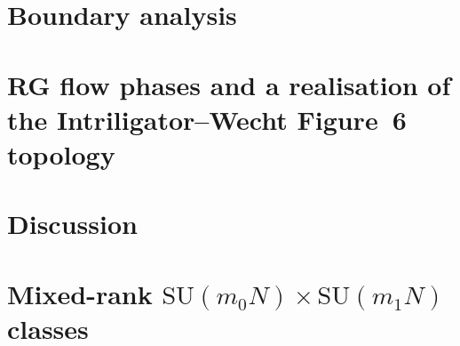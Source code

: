 \documentclass[11pt,a4paper]{article}
\newcommand{\SU}{\mathrm{SU}}
\begin{document}


\section{Boundary analysis}
\label{sec:boundary}



\section{RG flow phases and a realisation of the Intriligator--Wecht
  Figure~6 topology}
\label{sec:phases}



\section{Discussion}
\label{sec:discussion}



\appendix
\section{Mixed-rank $\SU(m_{0}N)\times\SU(m_{1}N)$ classes}
\label{app:mixed}





\end{document}

